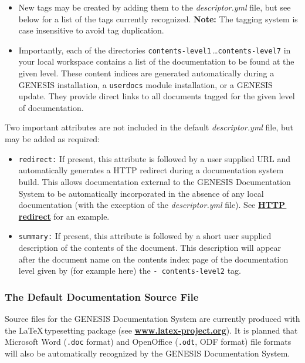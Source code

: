 \documentclass[12pt]{article}
\begin{document}
\begin{itemize}
\begin{itemize}
   \item New tags may be created by adding them to the {\it descriptor.yml} file, but see below for a list of the tags currently recognized.  {\bf Note:} The tagging system is case insensitive to avoid tag duplication.

   \item Importantly, each of the directories {\tt contents-level1}\,\ldots {\tt contents-level7} in your local workspace contains a list of the documentation to be found at the given level. These content indices are generated automatically during a GENESIS installation, a {\tt userdocs} module installation, or a GENESIS update. They provide direct links to all documents tagged for the given level of documentation.
\end{itemize}   
\end{itemize}
Two important attributes are not included in the default {\it descriptor.yml} file, but may be added as required:
\begin{itemize}
\item[]{\tt redirect:} If present, this attribute is followed by a user supplied URL and automatically generates a HTTP redirect during a documentation system build. This allows documentation external to the GENESIS Documentation System to be automatically incorporated in the absence of any local documentation (with the exception of the {\it descriptor.yml} file). See \href{../http-redirect/http-redirect.tex}{\bf HTTP\,redirect} for an example.
\item[]{\tt summary:} If present, this attribute is followed by a short user supplied description of the contents of the document. This description will appear after the document name on the contents index page of the documentation level given by (for example here) the {\tt -\,contents-level2} tag.

\end{itemize}

\subsubsection*{The Default Documentation Source File}

Source files for the GENESIS Documentation System are currently produced with the \LaTeX\,typesetting package (see \href{http://www.latex-project.org/}{\bf www.latex-project.org}). It is planned that Microsoft Word ({\tt .doc} format) and OpenOffice ({\tt .odt}, ODF format) file formats will also be automatically recognized by the GENESIS Documentation System.
\end{document}
